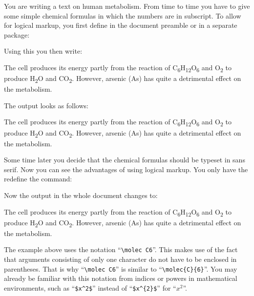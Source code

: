     \begin{Example}
      You are writing a text on human metabolism. From time to time you
      have to give some simple chemical formulas in which the numbers are
      in subscript. To allow for logical markup, you first define in the
      document preamble or in a separate package:
\begin{lstcode}
  \newcommand*{\molec}[2]{#1\textsubscript{#2}}
\end{lstcode}
      \newcommand*{\molec}[2]{#1\textsubscript{#2}}
      Using this you then write:
\begin{lstcode}
  The cell produces its energy partly from the reaction of \molec C6\molec
  H{12}\molec O6 and \molec O2 to produce \molec H2\Molec O{} and
  \molec C{}\molec O2.  However, arsenic (\molec{As}{}) has quite a
  detrimental effect on the metabolism.
\end{lstcode}
      The output looks as follows:
      \begin{ShowOutput}
        The cell produces its energy partly from the reaction of \molec C6\molec
        H{12}\molec O6 and \molec O2 to produce \molec H2\molec O{} and
        \molec C{}\molec O2.  However, arsenic (\molec{As}{}) has quite a
        detrimental effect on the metabolism.
      \end{ShowOutput}

      Some time later you decide that the chemical formulas should be
      typeset in sans serif. Now you can see the advantages of using
      logical markup. You only have the redefine the 
      command:
\begin{lstcode}
  \newcommand*{\molec}[2]{\textsf{#1\textsubscript{#2}}}
\end{lstcode}
      \renewcommand*{\molec}[2]{\textsf{#1\textsubscript{#2}}}
      Now the output in the whole document changes to:
      \begin{ShowOutput}
        The cell produces its energy partly from the reaction of \molec
        C6\molec H{12}\molec O6 and \molec O2 to produce \molec H2\molec
        O{} and \molec C{}\molec O2.  However, arsenic (\molec{As}{}) has
        quite a detrimental effect on the metabolism.
      \end{ShowOutput}
    \end{Example}
    \iftrue
      \begin{Explain}
        The example above uses the notation ``\verb|\molec C6|''.
        This makes use of the fact that arguments consisting of only one
        character do not have to be enclosed in parentheses. That is why
        ``\verb|\molec C6|'' is similar to ``\verb|\molec{C}{6}|''. You
        may already be familiar with this notation from indices or powers in
        mathematical environments, such as ``\verb|$x^2$|'' instead of
        ``\verb|$x^{2}$|''
        for ``$x^2$''.
      \end{Explain}
